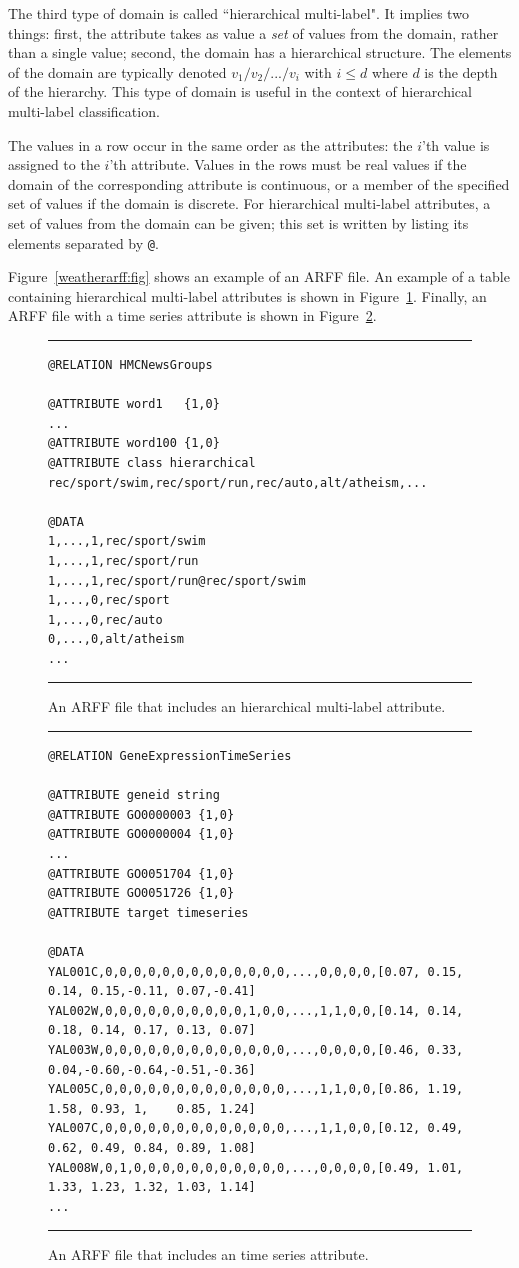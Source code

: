\documentclass[a4paper]{report}
\begin{document}
The third type of domain is called ``hierarchical multi-label".  It implies two things: first, the attribute takes as value a {\em set} of values from the domain, rather than a single value; second, the domain has a hierarchical structure.  The elements of the domain are typically denoted $v_1/v_2/.../v_i$ with $i \leq d$ where $d$ is the depth of the hierarchy.  This type of domain is useful in the context of hierarchical multi-label classification.  

The values in a	 row occur in the same order as the attributes: the $i$'th value is assigned to the $i$'th attribute.  Values in the rows must be real values if the domain of the corresponding attribute is continuous, or a member of the specified set of values if the domain is discrete.  For hierarchical multi-label attributes, a set of values from the domain can be given; this set is written by listing its elements separated by \verb^@^.

Figure~\ref{weatherarff:fig} shows an example of an ARFF file. An example of a table containing hierarchical multi-label attributes is shown in Figure~\ref{arffhmc:fig}. Finally, an ARFF file with a time series attribute is shown in Figure~\ref{arfftimeser:fig}.

\begin{figure}[tb]
\hrule
\begin{verbatim}
@RELATION HMCNewsGroups

@ATTRIBUTE word1   {1,0}
...
@ATTRIBUTE word100 {1,0}
@ATTRIBUTE class hierarchical rec/sport/swim,rec/sport/run,rec/auto,alt/atheism,...

@DATA
1,...,1,rec/sport/swim
1,...,1,rec/sport/run
1,...,1,rec/sport/run@rec/sport/swim
1,...,0,rec/sport
1,...,0,rec/auto
0,...,0,alt/atheism
...
\end{verbatim}
\hrule
\caption{An ARFF file that includes an hierarchical multi-label attribute.}
\label{arffhmc:fig}
\end{figure}

\begin{figure}[tb]
\hrule
\begin{verbatim}
@RELATION GeneExpressionTimeSeries

@ATTRIBUTE geneid string
@ATTRIBUTE GO0000003 {1,0}
@ATTRIBUTE GO0000004 {1,0}
...
@ATTRIBUTE GO0051704 {1,0}
@ATTRIBUTE GO0051726 {1,0}
@ATTRIBUTE target timeseries

@DATA
YAL001C,0,0,0,0,0,0,0,0,0,0,0,0,0,...,0,0,0,0,[0.07, 0.15, 0.14, 0.15,-0.11, 0.07,-0.41]
YAL002W,0,0,0,0,0,0,0,0,0,0,1,0,0,...,1,1,0,0,[0.14, 0.14, 0.18, 0.14, 0.17, 0.13, 0.07]
YAL003W,0,0,0,0,0,0,0,0,0,0,0,0,0,...,0,0,0,0,[0.46, 0.33, 0.04,-0.60,-0.64,-0.51,-0.36]
YAL005C,0,0,0,0,0,0,0,0,0,0,0,0,0,...,1,1,0,0,[0.86, 1.19, 1.58, 0.93, 1,    0.85, 1.24]
YAL007C,0,0,0,0,0,0,0,0,0,0,0,0,0,...,1,1,0,0,[0.12, 0.49, 0.62, 0.49, 0.84, 0.89, 1.08]
YAL008W,0,1,0,0,0,0,0,0,0,0,0,0,0,...,0,0,0,0,[0.49, 1.01, 1.33, 1.23, 1.32, 1.03, 1.14]
...
\end{verbatim}
\hrule
\caption{An ARFF file that includes an time series attribute.}
\label{arfftimeser:fig}
\end{figure}
\end{document}
